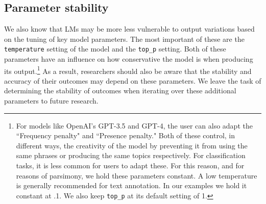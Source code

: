 \subsection{Parameter stability}

We also know that LMs may be more less vulnerable to output variations based on the tuning of key model parameters. The most important of these are the \texttt{temperature} setting of the model and the \texttt{top\_p} setting. Both of these parameters have an influence on how conservative the model is when producing its output.\footnote{For models like OpenAI's GPT-3.5 and GPT-4, the user can also adapt the ``Frequency penalty" and ``Presence penalty." Both of these control, in different ways, the creativity of the model by preventing it from using the same phrases or producing the same topics respectively. For classification tasks, it is less common for users to adapt these. For this reason, and for reasons of parsimony, we hold these parameters constant. A low temperature is generally recommended for text annotation. In our examples we hold it constant at .1. We also keep \texttt{top\_p} at its default setting of 1.} As a result, researchers should also be aware that the stability and accuracy of their outcomes may depend on these parameters. We leave the task of determining the stability of outcomes when iterating over these additional parameters to future research.